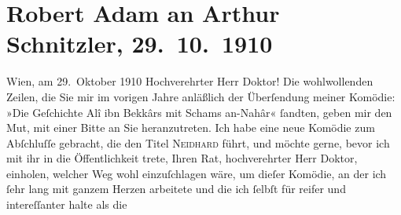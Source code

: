

         
         \renewcommand{\erwaehntePersonen}{Personen: Robert Adam}
         \renewcommand{\erwaehnteOrte}{Orte: Meidlinger Hauptstraße, Wien}
         \renewcommand{\erwaehnteWerke}{Werke: Die Geschichte des Alî ibn Bekkâr mit Schams an-Nahâr, Neidhard}
               \section[Robert Adam an Arthur Schnitzler, 29. 10. 1910]{ Robert Adam an Arthur Schnitzler, 29. 10. 1910}\nopagebreak{}\rehead{ }\begin{ledgroupsized}[t]{13cm}\normalsize\beginnumbering{} \toendnotes[C]{\smallbreak\pagebreak[2]} 
\toendnotes[C]{\smallbreak}\pstart
           \raggedleft{}{\pb}Wien, am 29. Oktober 1910\pend
           \pstart{}Hochverehrter Herr Doktor!\pend\pstart
           Die wohlwollenden Zeilen, die Sie mir im vorigen Jahre anläßlich der Überſendung
               meiner Komödie: »Die Geſchichte Alî ibn Bekkârs mit
                  Schams an-Nahâr« ſandten, geben mir den Mut, mit einer Bitte an Sie
               heranzutreten.\pend
           \pstart
           Ich habe eine neue Komödie zum Abſchluſſe gebracht, die den Titel \textsc{Neidhard} führt, und möchte gerne, bevor ich mit ihr in die Öffentlichkeit trete, {\pb}Ihren Rat, hochverehrter Herr Doktor, einholen,
               welcher Weg wohl einzuſchlagen wäre, um dieſer Komödie, an der ich ſehr lang mit
               ganzem Herzen arbeitete und die ich ſelbſt für reifer und intereſſanter halte als die

\end{ledgroupsized}

